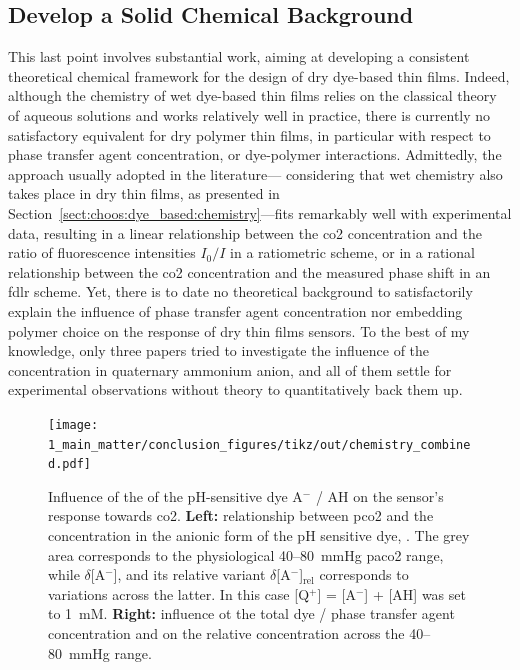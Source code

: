 \subsection{Develop a Solid Chemical Background}\label{subsect:conclusion:solid_chemistry}

This last point involves substantial work, aiming at developing a consistent theoretical chemical framework for the design of dry dye-based thin films. Indeed, although the chemistry of wet dye-based thin films relies on the classical theory of aqueous solutions and works relatively well in practice\cite{vurek1983, he1995, degrandpre1999}, there is currently no satisfactory equivalent for dry polymer thin films, in particular with respect to phase transfer agent concentration, or dye-polymer interactions. Admittedly, the approach usually adopted in the literature---\ie{} considering that wet chemistry also takes place in dry thin films, as presented in Section~\ref{sect:choos:dye_based:chemistry}---fits remarkably well with experimental data, resulting in a linear relationship between the \gls{co2} concentration and the ratio of fluorescence intensities $I_0/I$ in a ratiometric scheme\cite{borisov2007, chu2008, chu2009}, or in a rational relationship between the \gls{co2} concentration and the measured phase shift in an \gls{fdlr} scheme\cite{burke2006, cajlakovic2009}. Yet, there is to date no theoretical background to satisfactorily explain the influence of phase transfer agent concentration nor embedding polymer choice on the response of dry thin films sensors. To the best of my knowledge, only three papers tried to investigate the influence of the concentration in quaternary ammonium anion\cite{malins1998, fernandezsanchez2007, fernandezramos2018}, and all of them settle for experimental observations without theory to quantitatively back them up.

\begin{figure} %
	\centering
	\texttt{[image: 1\_main\_matter/conclusion\_figures/tikz/out/chemistry\_combined.pdf]}
	\caption[Influence of the \pKa{} of the pH-sensitive dye on the sensor's response towards \gls{co2}.]{Influence of the \pKa{} of the pH-sensitive dye A$^-$ / AH on the sensor's response towards \gls{co2}. \textbf{Left:} relationship between \gls{pco2} and the concentration in the anionic form of the pH sensitive dye, . The grey area corresponds to the physiological 40--80~mmHg \gls{paco2} range, while $\delta$[A$^-$], and its relative variant $\delta$[A$^-$]$_\text{rel}$ corresponds to \ce{[A^-]} variations across the latter. In this case [Q$^+$] = [A$^-$] + [AH] was set to 1~mM. \textbf{Right:} influence ot the total dye / phase transfer agent concentration and \pKa{} on the relative  concentration across the 40--80~mmHg range.}
	\label{fig:conclusion:chemistry_combined}
\end{figure}

